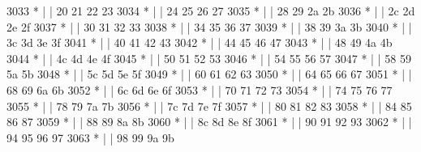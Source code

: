 \begin{DoxyCode}
3033 \textcolor{comment}{         * |    |                           20  21  22  23}
3034 \textcolor{comment}{         * |    |                           24  25  26  27}
3035 \textcolor{comment}{         * |    |                           28  29  2a  2b}
3036 \textcolor{comment}{         * |    |                           2c  2d  2e  2f}
3037 \textcolor{comment}{         * |    |                           30  31  32  33}
3038 \textcolor{comment}{         * |    |                           34  35  36  37}
3039 \textcolor{comment}{         * |    |                           38  39  3a  3b}
3040 \textcolor{comment}{         * |    |                           3c  3d  3e  3f}
3041 \textcolor{comment}{         * |    |                           40  41  42  43}
3042 \textcolor{comment}{         * |    |                           44  45  46  47}
3043 \textcolor{comment}{         * |    |                           48  49  4a  4b}
3044 \textcolor{comment}{         * |    |                           4c  4d  4e  4f}
3045 \textcolor{comment}{         * |    |                           50  51  52  53}
3046 \textcolor{comment}{         * |    |                           54  55  56  57}
3047 \textcolor{comment}{         * |    |                           58  59  5a  5b}
3048 \textcolor{comment}{         * |    |                           5c  5d  5e  5f}
3049 \textcolor{comment}{         * |    |                           60  61  62  63}
3050 \textcolor{comment}{         * |    |                           64  65  66  67}
3051 \textcolor{comment}{         * |    |                           68  69  6a  6b}
3052 \textcolor{comment}{         * |    |                           6c  6d  6e  6f}
3053 \textcolor{comment}{         * |    |                           70  71  72  73}
3054 \textcolor{comment}{         * |    |                           74  75  76  77}
3055 \textcolor{comment}{         * |    |                           78  79  7a  7b}
3056 \textcolor{comment}{         * |    |                           7c  7d  7e  7f}
3057 \textcolor{comment}{         * |    |                           80  81  82  83}
3058 \textcolor{comment}{         * |    |                           84  85  86  87}
3059 \textcolor{comment}{         * |    |                           88  89  8a  8b}
3060 \textcolor{comment}{         * |    |                           8c  8d  8e  8f}
3061 \textcolor{comment}{         * |    |                           90  91  92  93}
3062 \textcolor{comment}{         * |    |                           94  95  96  97}
3063 \textcolor{comment}{         * |    |                           98  99  9a  9b}

\end{DoxyCode}
